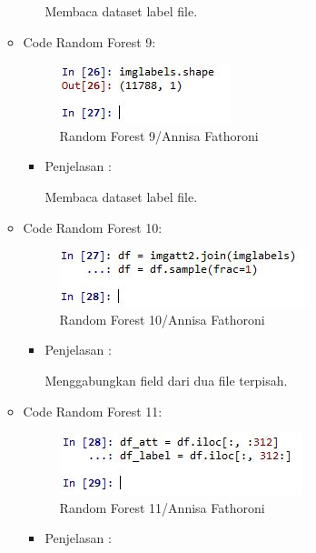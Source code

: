 \begin{enumerate}
\begin{itemize}
\begin{itemize}
Membaca dataset label file.

\end{itemize}
\item Code Random Forest 9:

\begin{figure}[ht]
\centering
\includegraphics[scale=0.6]{figures/Chapter3AnnisaFathoroni18.jpg}
\caption{Random Forest 9/Annisa Fathoroni}
\label{contoh}
\end{figure}

\begin{itemize}
\item Penjelasan :

Membaca dataset label file.

\end{itemize}
\item Code Random Forest 10:

\begin{figure}[ht]
\centering
\includegraphics[scale=0.6]{figures/Chapter3AnnisaFathoroni19.jpg}
\caption{Random Forest 10/Annisa Fathoroni}
\label{contoh}
\end{figure}

\begin{itemize}
\item Penjelasan :

Menggabungkan field dari dua file terpisah.

\end{itemize}
\item Code Random Forest 11:

\begin{figure}[ht]
\centering
\includegraphics[scale=0.6]{figures/Chapter3AnnisaFathoroni20.jpg}
\caption{Random Forest 11/Annisa Fathoroni}
\label{contoh}
\end{figure}

\begin{itemize}
\item Penjelasan :


\end{itemize}
\end{itemize}
\end{enumerate}
